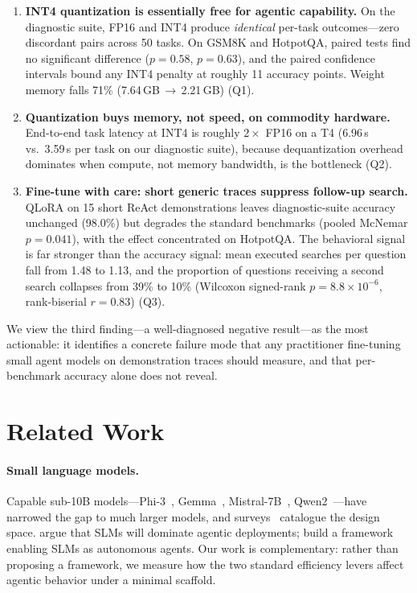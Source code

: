 \documentclass{article}
\begin{document}
\begin{enumerate}
  \item \textbf{INT4 quantization is essentially free for agentic
  capability.} On the diagnostic suite, FP16 and INT4 produce
  \emph{identical} per-task outcomes---zero discordant pairs across 50
  tasks. On GSM8K and HotpotQA, paired tests find no significant
  difference ($p{=}0.58$, $p{=}0.63$), and the paired confidence
  intervals bound any INT4 penalty at roughly 11 accuracy points.
  Weight memory falls 71\% (7.64\,GB\,$\rightarrow$\,2.21\,GB) (Q1).
  \item \textbf{Quantization buys memory, not speed, on commodity
  hardware.} End-to-end task latency at INT4 is roughly $2\times$ FP16
  on a T4 (6.96\,s vs.\ 3.59\,s per task on our diagnostic suite),
  because dequantization overhead dominates when compute, not memory
  bandwidth, is the bottleneck (Q2).
  \item \textbf{Fine-tune with care: short generic traces suppress
  follow-up search.} QLoRA on 15 short ReAct demonstrations leaves
  diagnostic-suite accuracy unchanged (98.0\%) but degrades the standard
  benchmarks (pooled McNemar $p{=}0.041$), with the effect concentrated
  on HotpotQA. The behavioral signal is far stronger than the accuracy
  signal: mean executed searches per question fall from 1.48 to 1.13, and
  the proportion of questions receiving a second search collapses from 39\%
  to 10\% (Wilcoxon signed-rank $p{=}8.8\times10^{-6}$, rank-biserial
  $r{=}0.83$) (Q3).
\end{enumerate}

We view the third finding---a well-diagnosed negative result---as the
most actionable: it identifies a concrete failure mode that any
practitioner fine-tuning small agent models on demonstration traces
should measure, and that per-benchmark accuracy alone does not reveal.

\section{Related Work}

\paragraph{Small language models.}
Capable sub-10B models---Phi-3~\cite{abdin2024phi3},
Gemma~\cite{gemma2024}, Mistral-7B~\cite{jiang2023mistral},
Qwen2~\cite{yang2024qwen2}---have narrowed the gap to much larger models,
and surveys~\cite{wan2024efficient,lu2024slmsurvey} catalogue the design
space. \citet{belcak2025slm} argue that SLMs will dominate agentic
deployments; \citet{srivastava2026effgen} build a framework enabling SLMs as
autonomous agents. Our work is complementary: rather than proposing a
framework, we measure how the two standard efficiency levers affect agentic
behavior under a minimal scaffold.
\end{document}
